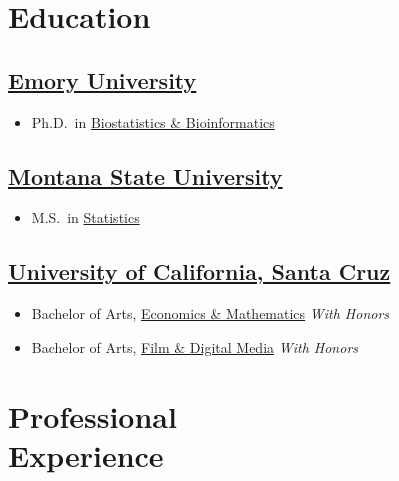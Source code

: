 \documentclass{wm_cv}
\begin{document}
\maketitle%

\section{Education}

\subsection{\href{https://www.emory.edu/home/index.html}{Emory University}} 
\vspace{-\parskip}%
\begin{itemize}[label={}]
    \item Ph.D.\ in \href{https://www.sph.emory.edu/departments/bios/degree-programs/phd/index.html}{Biostatistics \& Bioinformatics} 
\end{itemize}

\subsection{\href{https://www.montana.edu/}{Montana State University}} 
\vspace{-\parskip}%
\begin{itemize}[label={}]
  \item M.S.\ in \href{http://catalog.montana.edu/graduate/letters-science/mathematical-sciences/ms-statistics/}{Statistics} 
\end{itemize}

\subsection{\href{https://www.ucsc.edu/}{University of California, Santa Cruz}}
\vspace{-\parskip}%
\begin{itemize}[label={}]
  \item Bachelor of Arts, \href{https://economics.ucsc.edu/academics/undergraduate-program/majors-minor/econ-math.html}{Economics \& Mathematics} \emph{With Honors}
  \item Bachelor of Arts, \href{https://admissions.sa.ucsc.edu/majors/filmdigital}{Film \& Digital Media} \emph{With Honors}
\end{itemize}

\section{Professional \\ Experience}
\end{document}
